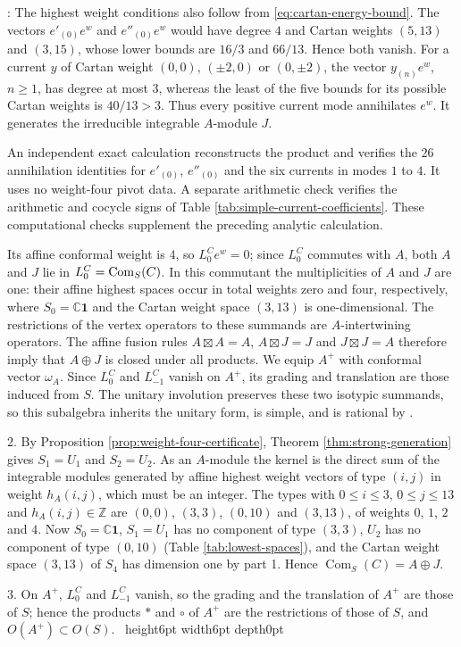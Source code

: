 \documentclass[leqno]{article}
\newcommand{\Cbb}{\ensuremath{\mathbb{C}}}
\newcommand{\Z}{\ensuremath{\mathbb{Z}}}
\renewcommand{\leq}{\ensuremath{\leqslant}}
\renewcommand{\geq}{\ensuremath{\geqslant}}
\newcommand{\qed}{\hfill \vrule height6pt  width6pt depth0pt}
\let\ker\relax
\DeclareMathOperator{\ker}{Ker}
\newenvironment{proof}[1][]{\noindent {\it Proof #1} : }{\hbox{~}\qed
\smallskip
}
\numberwithin{equation}{section}
\begin{document}
\begin{proof}
The highest weight conditions also follow from \eqref{eq:cartan-energy-bound}. The vectors $e'_{(0)}e^w$ and $e''_{(0)}e^w$ would have degree $4$ and Cartan weights $(5,13)$ and $(3,15)$, whose lower bounds are $16/3$ and $66/13$. Hence both vanish. For a current $y$ of Cartan weight $(0,0)$, $(\pm2,0)$ or $(0,\pm2)$, the vector $y_{(n)}e^w$, $n \geq 1$, has degree at most $3$, whereas the least of the five bounds for its possible Cartan weights is $40/13 > 3$. Thus every positive current mode annihilates $e^w$. It generates the irreducible integrable $A$-module $J$.

An independent exact calculation reconstructs the product and verifies the $26$ annihilation identities for $e'_{(0)}$, $e''_{(0)}$ and the six currents in modes $1$ to $4$. It uses no weight-four pivot data. A separate arithmetic check verifies the arithmetic and cocycle signs of Table \ref{tab:simple-current-coefficients}. These computational checks supplement the preceding analytic calculation.

Its affine conformal weight is $4$, so $L^C_0e^w = 0$; since $L^C_0$ commutes with $A$, both $A$ and $J$ lie in $\ker L^C_0 = \operatorname{Com}_S(C)$. In this commutant the multiplicities of $A$ and $J$ are one: their affine highest spaces occur in total weights zero and four, respectively, where $S_0 = \Cbb\mathbf 1$ and the Cartan weight space $(3,13)$ is one-dimensional. The restrictions of the vertex operators to these summands are $A$-intertwining operators. The affine fusion rules $A \boxtimes A = A$, $A \boxtimes J = J$ and $J \boxtimes J = A$ therefore imply that $A \oplus J$ is closed under all products. We equip $A^+$ with conformal vector $\omega_A$. Since $L^C_0$ and $L^C_{-1}$ vanish on $A^+$, its grading and translation are those induced from $S$. The unitary involution preserves these two isotypic summands, so this subalgebra inherits the unitary form, is simple, and is rational by \cite[Theorem 4.5]{DLM96}.

2. By Proposition \ref{prop:weight-four-certificate}, Theorem \ref{thm:strong-generation} gives $S_1 = U_1$ and $S_2 = U_2$. As an $A$-module the kernel is the direct sum of the integrable modules generated by affine highest weight vectors of type $(i,j)$ in weight $h_A(i,j)$, which must be an integer. The types with $0 \leq i \leq 3$, $0 \leq j \leq 13$ and $h_A(i,j) \in \Z$ are $(0,0)$, $(3,3)$, $(0,10)$ and $(3,13)$, of weights $0$, $1$, $2$ and $4$. Now $S_0 = \Cbb\mathbf 1$, $S_1 = U_1$ has no component of type $(3,3)$, $U_2$ has no component of type $(0,10)$ (Table \ref{tab:lowest-spaces}), and the Cartan weight space $(3,13)$ of $S_4$ has dimension one by part 1. Hence $\operatorname{Com}_S(C) = A \oplus J$.

3. On $A^+$, $L^C_0$ and $L^C_{-1}$ vanish, so the grading and the translation of $A^+$ are those of $S$; hence the products $*$ and $\circ$ of $A^+$ are the restrictions of those of $S$, and $O(A^+) \subset O(S)$.
\end{proof}
\end{document}
